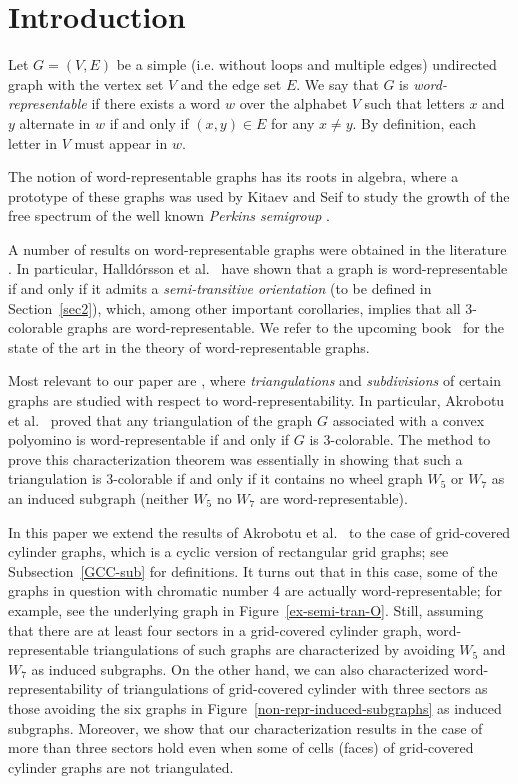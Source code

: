 \documentclass[12pt]{article}
\numberwithin{equation}{section}
\begin{document}
\section{Introduction}

Let $G=(V,E)$ be a simple (i.e. without loops and multiple edges) undirected graph with
the vertex set $V$ and the edge set $E$. We say that $G$ is {\em word-representable} if there exists a word $w$
over the alphabet $V$ such that letters $x$ and $y$ alternate in $w$ if and only if $(x,y)\in E$ for
any $x\neq y$. By definition, each letter in $V$ must appear in $w$.

The notion of word-representable graphs has its roots in algebra,
where a prototype of these graphs was used by Kitaev and Seif to study
the growth of the free spectrum of the well known
{\em Perkins semigroup} \cite{Kitaev08b}.

A number of results on word-representable graphs
were obtained in the literature \cite{Akrobotu, CKS, Collins14, GK, Halldorsson11, Halldorsson10,Halldorsson15, Kitaev08a, Kitaev11c, Kitaev11}. In
particular, Halld\'{o}rsson et al.~\cite{Halldorsson15} have shown that a graph is word-representable
if and only if it admits a {\em semi-transitive orientation} (to be defined in Section~\ref{sec2}), which, among other important corollaries, implies that all 3-colorable graphs are word-representable. We refer to the upcoming book~\cite{KitLoz} for the state of the art in the theory of word-representable graphs.

Most relevant to our paper are \cite{Akrobotu,CKS,GK}, where {\em triangulations} and {\em subdivisions} of certain graphs are studied with respect to word-representability. In particular, Akrobotu et al.~\cite{Akrobotu} proved that any triangulation of the graph $G$ associated with a convex polyomino is word-representable if and only if $G$ is 3-colorable. The method to prove this characterization theorem was essentially in showing that such a triangulation is 3-colorable if and only if it contains no wheel graph $W_5$ or $W_7$ as an induced subgraph (neither $W_5$ no $W_7$ are word-representable).

In this paper we extend the results of Akrobotu et al.~\cite{Akrobotu} to the case of grid-covered cylinder graphs, which is a cyclic version of rectangular grid graphs; see Subsection~\ref{GCC-sub} for definitions. It turns out that in this case, some of the graphs in question with chromatic number 4 are actually word-representable; for example, see the underlying graph in Figure~\ref{ex-semi-tran-O}. Still, assuming that there are at least four sectors in a grid-covered cylinder graph, word-representable triangulations of such graphs are characterized by avoiding $W_5$ and $W_7$ as induced subgraphs. On the other hand, we can also characterized word-representability of triangulations of grid-covered cylinder with three sectors as those avoiding the six graphs in Figure~\ref{non-repr-induced-subgraphs} as induced subgraphs. Moreover, we show that our characterization results in the case of more than three sectors hold even when some of cells (faces) of grid-covered cylinder graphs are not triangulated.
\end{document}
